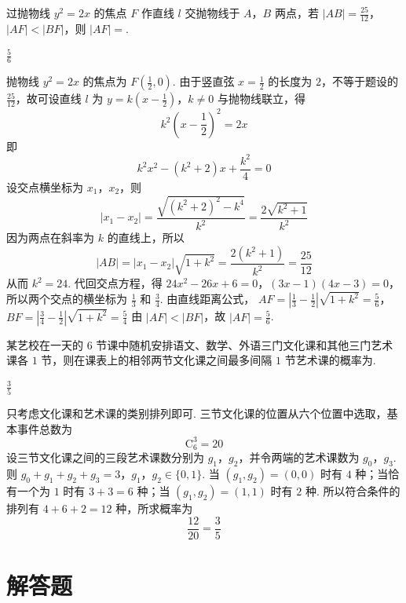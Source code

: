 \begin{problem}
过抛物线 \(y^{2}=2x\) 的焦点 \(F\) 作直线 \(l\) 交抛物线于 \(A\)，\(B\) 两点，若 \(|AB|=\frac{25}{12}\)，\(|AF|<|BF|\)，则 \(|AF|=\)\fillinblank{}.

\begin{answer}
\(\frac{5}{6}\)
\end{answer}

\begin{solution}
抛物线 \(y^{2}=2x\) 的焦点为 \(F\left(\frac12,0\right)\). 由于竖直弦 \(x=\frac12\) 的长度为 \(2\)，不等于题设的 \(\frac{25}{12}\)，故可设直线 \(l\) 为
\(y=k\left(x-\frac12\right)\)，\(k\ne0\)
与抛物线联立，得
\[
k^{2}\left(x-\frac12\right)^{2}=2x
\]
即
\[
k^{2}x^{2}-(k^{2}+2)x+\frac{k^{2}}4=0
\]
设交点横坐标为 \(x_{1}\)，\(x_{2}\)，则
\[
|x_{1}-x_{2}|=\frac{\sqrt{(k^{2}+2)^{2}-k^{4}}}{k^{2}}
=\frac{2\sqrt{k^{2}+1}}{k^{2}}
\]
因为两点在斜率为 \(k\) 的直线上，所以
\[
|AB|=|x_{1}-x_{2}|\sqrt{1+k^{2}}
=\frac{2(k^{2}+1)}{k^{2}}=\frac{25}{12}
\]
从而 \(k^{2}=24\). 代回交点方程，得
\(24x^{2}-26x+6=0\)，\((3x-1)(4x-3)=0\)，
所以两个交点的横坐标为 \(\frac13\) 和 \(\frac34\). 由直线距离公式，
\(AF=\left|\frac13-\frac12\right|\sqrt{1+k^{2}}=\frac56\)，\(BF=\left|\frac34-\frac12\right|\sqrt{1+k^{2}}=\frac54\)
由 \(|AF|<|BF|\)，故 \(|AF|=\frac56\).
\end{solution}
\end{problem}

\begin{problem}
某艺校在一天的 \(6\) 节课中随机安排语文、数学、外语三门文化课和其他三门艺术课各 \(1\) 节，则在课表上的相邻两节文化课之间最多间隔 \(1\) 节艺术课的概率为\fillinblank{}.

\begin{answer}
\(\frac{3}{5}\)
\end{answer}

\begin{solution}
只考虑文化课和艺术课的类别排列即可. 三节文化课的位置从六个位置中选取，基本事件总数为
\[
\mathrm C_{6}^{3}=20
\]
设三节文化课之间的三段艺术课数分别为 \(g_{1}\)，\(g_{2}\)，并令两端的艺术课数为 \(g_{0}\)，\(g_{3}\). 则
\(g_{0}+g_{1}+g_{2}+g_{3}=3\)，\(g_{1}\)，\(g_{2}\in\{0,1\}\).
当 \((g_{1},g_{2})=(0,0)\) 时有 \(4\) 种；当恰有一个为 \(1\) 时有 \(3+3=6\) 种；当 \((g_{1},g_{2})=(1,1)\) 时有 \(2\) 种. 所以符合条件的排列有 \(4+6+2=12\) 种，所求概率为
\[
\frac{12}{20}=\frac35
\]
\end{solution}
\end{problem}

\section{解答题}


